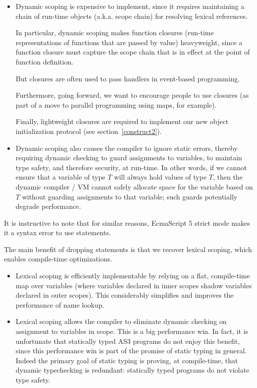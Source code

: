 \begin{itemize}

\item Dynamic scoping is expensive to implement, since it requires
maintaining a chain of run-time objects (a.k.a. scope chain) for
resolving lexical references.

In particular, dynamic scoping makes function closures (run-time representations of functions that are passed by
value) heavyweight, since a function closure must capture the scope chain that is in effect
at the point of function definition.

But closures are often used to pass handlers in
event-based programming.

Furthermore, going forward, we want to encourage people to use closures
(as part of a move to parallel programming using maps, for example).

Finally, lightweight closures are required to implement our new object
initialization protocol (see section~\ref{construct2}).

\item Dynamic scoping also causes the compiler to ignore static errors, thereby
requiring dynamic checking to guard assignments to variables, to maintain type
safety, and therefore security, at run-time.
In other words, if we cannot ensure that a variable of type $T$ will always hold
values of type $T$, then the dynamic compiler / VM cannot safely allocate space
for the variable based on $T$ without guarding assignments to that variable;
such guards potentially degrade performance.

\end{itemize}

It is instructive to note that for similar reasons, EcmaScript 5 strict mode
makes it a syntax error to use  statements.

The main benefit of dropping  statements is that we recover
lexical scoping, which enables compile-time optimizations.

\begin{itemize}
\item Lexical scoping is efficiently implementable by relying on a flat, compile-time map over
variables (where variables declared in inner scopes shadow variables
declared in outer scopes). This considerably simplifies and improves
the performance of name lookup.

\item Lexical scoping allows the compiler to eliminate dynamic checking on
assignment to variables in scope. This is a big performance
win. In fact, it is unfortunate that statically typed AS3 programs
do not enjoy this benefit, since this performance win is part of the promise of
static typing in general. Indeed the primary goal of static typing is
proving, at compile-time, that dynamic typechecking is redundant:
statically typed programs do not violate type safety.

\end{itemize}

